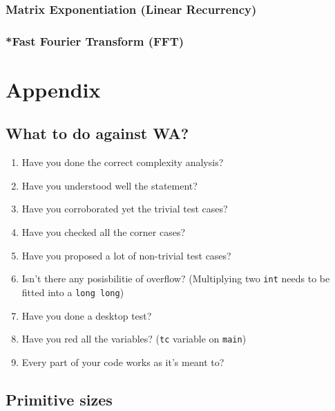 \documentclass[letterpaper,landscape]{article}
\begin{document}
\subsubsection{Matrix Exponentiation (Linear Recurrency)}



\subsubsection{*Fast Fourier Transform (FFT)}

\newpage
\section{Appendix}

\subsection{What to do against WA?}

\begin{enumerate}
    \item Have you done the correct complexity analysis?
    \item Have you understood well the statement?
    \item Have you corroborated yet the trivial test cases?
    \item Have you checked all the corner cases?
    \item Have you proposed a lot of non-trivial test cases?
    \item Isn't there any posisbilitie of overflow? (Multiplying two \texttt{int} needs to be fitted into a \texttt{long long})
    \item Have you done a desktop test?
    \item Have you red all the variables? (\texttt{tc} variable on \texttt{main})
    \item Every part of your code works as it's meant to? 
\end{enumerate}

\subsection{Primitive sizes}
\end{document}
